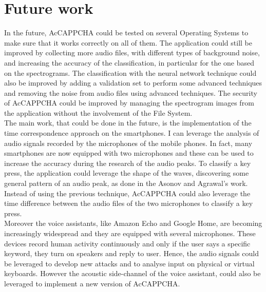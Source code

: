 \chapter{Future work}\label{chapter:Future}
In the future, AcCAPPCHA could be tested on several Operating Systems to make sure that it works correctly on all of them. The application could still be improved by collecting more audio files, with different types of background noise, and increasing the accuracy of the classification, in particular for the one based on the spectrograms. The classification with the neural network technique could also be improved by adding a validation set to perform some advanced techniques and removing the noise from audio files using advanced techniques. The security of AcCAPPCHA could be improved by managing the spectrogram images from the application without the involvement of the File System.\\
The main work, that could be done in the future, is the implementation of the time correspondence approach on the smartphones. I can leverage the analysis of audio signals recorded by the microphones of the mobile phones. In fact, many smartphones are now equipped with two microphones and these can be used to increase the accuracy during the research of the audio peaks. To classify a key press, the application could leverage the shape of the waves, discovering some general pattern of an audio peak, as done in the Asonov and Agrawal's work\cite{keyboard_acoustic}. Instead of using the previous technique, AcCAPPCHA could also leverage the time difference between the audio files of the two microphones to classify a key press\cite{smartphone_acoustic}.\\
Moreover the voice assistants, like Amazon Echo and Google Home, are becoming increasingly widespread and they are equipped with several microphones. These devices record human activity continuously and only if the user says a specific keyword, they turn on speakers and reply to user. Hence, the audio signals could be leveraged to develop new attacks and to analyse input on physical or virtual keyboards\cite{voice_assistant}. However the acoustic side-channel of the voice assistant, could also be leveraged to implement a new version of AcCAPPCHA.\\